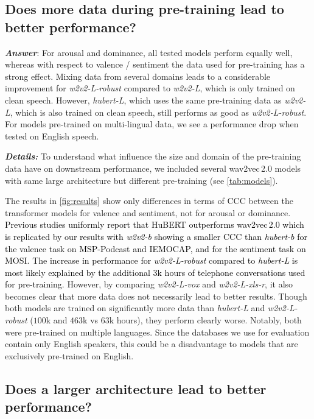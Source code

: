 \documentclass{article}
\newcommand\wbase{\mbox{\emph{w2v2-b}}}
\newcommand\hbase{\mbox{\emph{hubert-b}}}
\newcommand\wlarge{\mbox{\emph{w2v2-L}}}
\newcommand\hlarge{\mbox{\emph{hubert-L}}}
\newcommand\wrobust{\mbox{\emph{w2v2-L-robust}}}
\newcommand\wvox{\mbox{\emph{w2v2-L-vox}}}
\newcommand\wxlsr{\mbox{\emph{w2v2-L-xls-r}}}
\newcommand{\review}[1]{\textcolor{black}{#1}}
\newcommand\msppodcast{\mbox{MSP-Podcast}}
\newcommand\iemocap{\mbox{IEMOCAP}}
\newcommand\mosi{\mbox{MOSI}}
\newcommand{\wtov}{wav2vec\,2.0}
\newcommand{\hubert}{HuBERT}
\begin{document}
\subsection{Does more data during pre-training lead to better performance?}
\label{subsec:influence_data}

\emph{\textbf{Answer}}:
For arousal and dominance,
all tested models perform equally well,
whereas with respect to valence / sentiment the data used for pre-training has a strong effect.
Mixing data from several domains leads to a considerable improvement for {\wrobust}
compared to {\wlarge},
which is only trained on clean speech.
However, {\hlarge}, 
which uses the same pre-training data as {\wlarge},
which is also trained on clean speech,
still performs as good as {\wrobust}.
For models pre-trained on multi-lingual data,
we see a performance drop when tested on English speech.

\noindent
\emph{\textbf{Details:}}
To understand
what influence the size and domain of the pre-training data
have on downstream performance,
we included several {\wtov} models
with same large architecture but different pre-training (see \cref{tab:models}). 

The results in \cref{fig:results} show only differences
in terms of \ac{CCC} between the transformer models
for valence and sentiment,
not for arousal or dominance.
\review{Previous studies uniformly report 
that {\hubert} outperforms {\wtov}
which is replicated by our results 
with {\wbase} showing a smaller CCC than {\hbase}
for the valence task on {\msppodcast} and {\iemocap}, 
and for the sentiment task on {\mosi}. 
The increase in performance 
for {\wrobust} 
compared to {\hlarge} 
is most likely explained 
by the additional 3k hours of telephone conversations 
used for pre-training.}
However, by comparing {\wvox} and {\wxlsr},
it also becomes clear
that more data does not necessarily lead to better results. 
Though both models are trained on significantly more data
than {\hlarge} and {\wrobust} ($100$k and $463$k vs $63$k hours),
they perform clearly worse.
Notably, both were pre-trained on multiple languages. 
Since the databases we use for evaluation contain only English speakers,
this could be a disadvantage to models that are exclusively pre-trained on English.




\subsection{Does a larger architecture lead to better performance?}
\label{subsec:larger_architecture}
\end{document}
